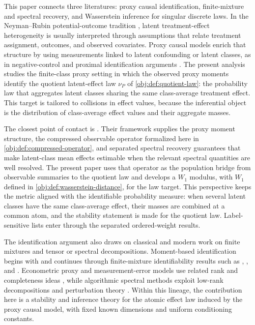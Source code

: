 \documentclass[11pt]{article}
\begin{document}
This paper connects three literatures: proxy causal identification, finite-mixture and spectral recovery, and Wasserstein inference for singular discrete laws. In the Neyman--Rubin potential-outcome tradition \citep{Neyman1990,Rubin1974,Holland1986,ImbensRubin2015}, latent treatment-effect heterogeneity is usually interpreted through assumptions that relate treatment assignment, outcomes, and observed covariates. Proxy causal models enrich that structure by using measurements linked to latent confounding or latent classes, as in negative-control and proximal identification arguments \citep{MiaoGengTchetgen2018,TchetgenTchetgen2024,ShiMiaoNelsonTchetgen2020,CuiPuShiMiaoTchetgen2024,MiaoHuOgburnZhou2023,QiMiaoZhang2024,LiuParkLiTchetgen2024,LiLindermanShiTchetgen2024,AiShan2025,SahaBatesShah2026}. The present analysis studies the finite-class proxy setting in which the observed proxy moments identify the quotient latent-effect law \(\nu_P\) of \cref{obj:def:quotient-law}: the probability law that aggregates latent classes sharing the same class-average treatment effect. This target is tailored to collisions in effect values, because the inferential object is the distribution of class-average effect values and their aggregate masses.

The closest point of contact is \citet{VirkMazaheriWu2026}. Their framework supplies the proxy moment structure, the compressed observable operator formalized here in \cref{obj:def:compressed-operator}, and separated spectral recovery guarantees that make latent-class mean effects estimable when the relevant spectral quantities are well resolved. The present paper uses that operator as the population bridge from observable summaries to the quotient law and develops a \(W_1\) modulus, with \(W_1\) defined in \cref{obj:def:wasserstein-distance}, for the law target. This perspective keeps the metric aligned with the identifiable probability measure: when several latent classes have the same class-average effect, their masses are combined at a common atom, and the stability statement is made for the quotient law. Label-sensitive lists enter through the separated ordered-weight results.

The identification argument also draws on classical and modern work on finite mixtures and tensor or spectral decompositions. Moment-based identification begins with \citet{Pearson1894} and continues through finite-mixture identifiability results such as \citet{Teicher1963}, \citet{Lindsay1995}, and \citet{AllmanMatiasRhodes2009}. Econometric proxy and measurement-error models use related rank and completeness ideas \citep{Hu2008,HuSchennach2008,KasaharaShimotsu2009,BonhommeJochmansRobin2016}, while algorithmic spectral methods exploit low-rank decompositions and perturbation theory \citep{HsuKakadeZhang2009,Anandkumar2014,SidiropoulosBro2000,BauerFike1960,Kato1995,DavisKahan1970,StewartSun1990,MazaheriSquiresUhler2025}. Within this lineage, the contribution here is a stability and inference theory for the atomic effect law induced by the proxy causal model, with fixed known dimensions and uniform conditioning constants.
\end{document}
